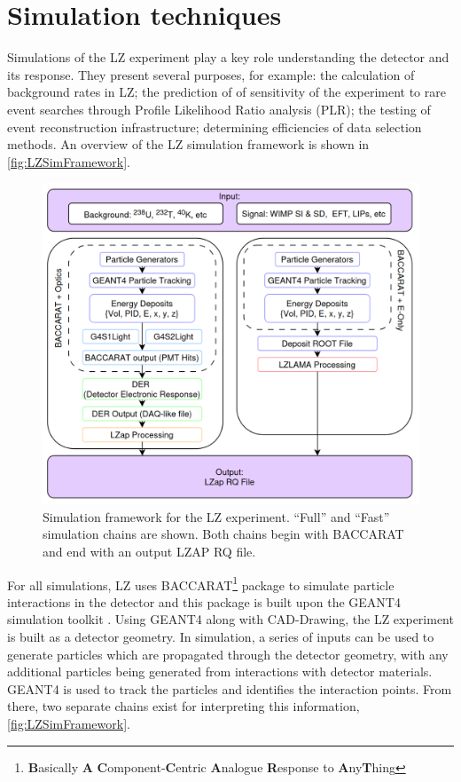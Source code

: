 \section{Simulation techniques}
Simulations of the LZ experiment play a key role understanding the detector and its response. They present several purposes, for example: the calculation of background rates in LZ; the prediction of of sensitivity of the experiment to rare event searches through Profile Likelihood Ratio analysis (PLR); the testing of event reconstruction infrastructure; determining efficiencies of data selection methods. An overview of the LZ simulation framework is shown in \autoref{fig:LZSimFramework}.
\begin{figure}[h!]
    \centering
    \includegraphics[width=\linewidth]{figures/LZ/LZSimFramework.png}
    \caption{Simulation framework for the LZ experiment. ``Full'' and ``Fast'' simulation chains are shown. Both chains begin with BACCARAT and end with an output LZAP RQ file.}
    \label{fig:LZSimFramework}
\end{figure}
For all simulations, LZ uses BACCARAT\footnote{\textbf{B}asically \textbf{A} \textbf{C}omponent-\textbf{C}entric \textbf{A}nalogue \textbf{R}esponse to \textbf{A}ny\textbf{T}hing}\cite{LZ_SIMS} package to simulate particle interactions in the detector and this package is built upon the GEANT4 simulation toolkit \cite{GEANT4:2002zbu}. Using GEANT4 along with CAD-Drawing, the LZ experiment is built as a detector geometry. In simulation, a series of inputs can be used to generate particles which are propagated through the detector geometry, with any additional particles being generated from interactions with detector materials. GEANT4 is used to track the particles and identifies the interaction points. From there, two separate chains exist for interpreting this information, \autoref{fig:LZSimFramework}.

